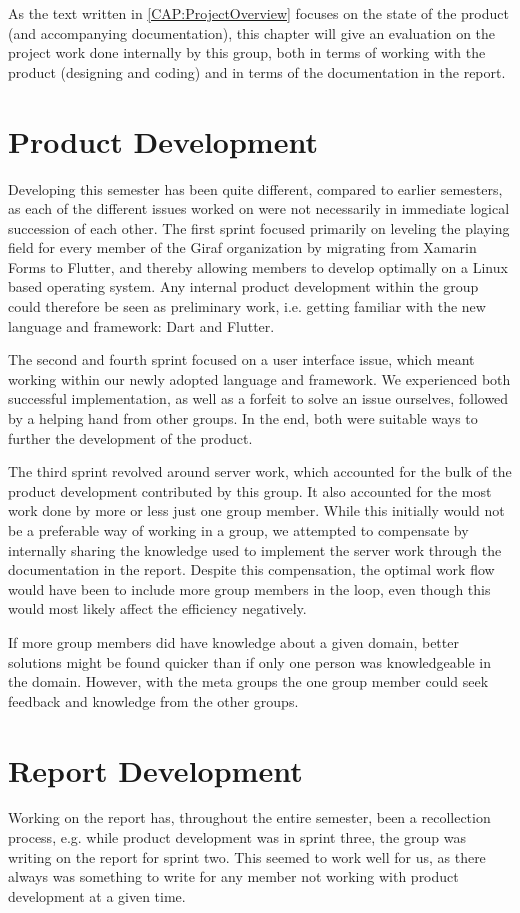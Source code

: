 As the text written in \autoref{CAP:ProjectOverview} focuses on the state of the product (and accompanying documentation), this chapter will give an evaluation on the project work done internally by this group, both in terms of working with the product (designing and coding) and in terms of the documentation in the report.

\section{Product Development}
Developing this semester has been quite different, compared to earlier semesters, as each of the different issues worked on were not necessarily in immediate logical succession of each other.
The first sprint focused primarily on leveling the playing field for every member of the Giraf organization by migrating from Xamarin Forms to Flutter, and thereby allowing members to develop optimally on a Linux based operating system.
Any internal product development within the group could therefore be seen as preliminary work, i.e. getting familiar with the new language and framework: Dart and Flutter.


The second and fourth sprint focused on a user interface issue, which meant working within our newly adopted language and framework.
We experienced both successful implementation, as well as a forfeit to solve an issue ourselves, followed by a helping hand from other groups.
In the end, both were suitable ways to further the development of the product.

The third sprint revolved around server work, which accounted for the bulk of the product development contributed by this group.
It also accounted for the most work done by more or less just one group member.
While this initially would not be a preferable way of working in a group, we attempted to compensate by internally sharing the knowledge used to implement the server work through the documentation in the report.
Despite this compensation, the optimal work flow would have been to include more group members in the loop, even though this would most likely affect the efficiency negatively.

If more group members did have knowledge about a given domain, better solutions might be found quicker than if only one person was knowledgeable in the domain.
However, with the meta groups the one group member could seek feedback and knowledge from the other groups.

\section{Report Development}
Working on the report has, throughout the entire semester, been a recollection process, e.g. while product development was in sprint three, the group was writing on the report for sprint two.
This seemed to work well for us, as there always was something to write for any member not working with product development at a given time.

